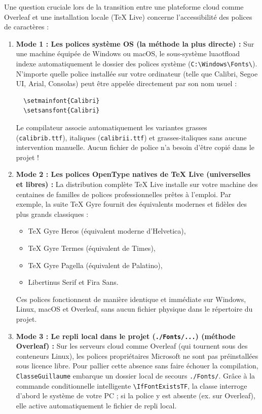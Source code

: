 Une question cruciale lors de la transition entre une plateforme cloud comme Overleaf et une installation locale (TeX Live) concerne l'accessibilité des polices de caractères :

\begin{enumerate}
  \item \textbf{Mode 1 : Les polices système OS (la méthode la plus directe) :}
  Sur une machine équipée de Windows ou macOS, le sous-système \textsf{luaotfload} indexe automatiquement le dossier des polices système (\texttt{C:\textbackslash Windows\textbackslash Fonts\textbackslash}).
  N'importe quelle police installée sur votre ordinateur (telle que \textsf{Calibri}, \textsf{Segoe UI}, \textsf{Arial}, \textsf{Consolas}) peut être appelée directement par son nom usuel :
  \begin{verbatim}
  \setmainfont{Calibri}
  \setsansfont{Calibri}
  \end{verbatim}
  Le compilateur associe automatiquement les variantes grasses (\texttt{calibrib.ttf}), italiques (\texttt{calibrii.ttf}) et grasses-italiques sans aucune intervention manuelle.
  Aucun fichier de police n'a besoin d'être copié dans le projet !

  \item \textbf{Mode 2 : Les polices OpenType natives de \TeX{} Live (universelles et libres) :}
  La distribution complète \TeX{} Live installe sur votre machine des centaines de familles de polices professionnelles prêtes à l'emploi.
  Par exemple, la suite \textsf{\TeX{} Gyre} fournit des équivalents modernes et fidèles des plus grands classiques :
  \begin{itemize}
    \item \textsf{TeX Gyre Heros} (équivalent moderne d'Helvetica),
    \item \textsf{TeX Gyre Termes} (équivalent de Times),
    \item \textsf{TeX Gyre Pagella} (équivalent de Palatino),
    \item \textsf{Libertinus Serif} et \textsf{Fira Sans}.
  \end{itemize}
  Ces polices fonctionnent de manière identique et immédiate sur Windows, Linux, macOS et Overleaf, sans aucun fichier physique dans le répertoire du projet.

  \item \textbf{Mode 3 : Le repli local dans le projet (\texttt{./Fonts/...}) (méthode Overleaf) :}
  Sur les serveurs cloud comme Overleaf (qui tournent sous des conteneurs Linux), les polices propriétaires Microsoft ne sont pas préinstallées sous licence libre.
  Pour pallier cette absence sans faire échouer la compilation, \texttt{ClasseGuillaume} embarque un dossier local de secours \texttt{./Fonts/}.
  Grâce à la commande conditionnelle intelligente \texttt{\textbackslash IfFontExistsTF}, la classe interroge d'abord le système de votre PC ; si la police y est absente (ex. sur Overleaf), elle active automatiquement le fichier de repli local.
\end{enumerate}

